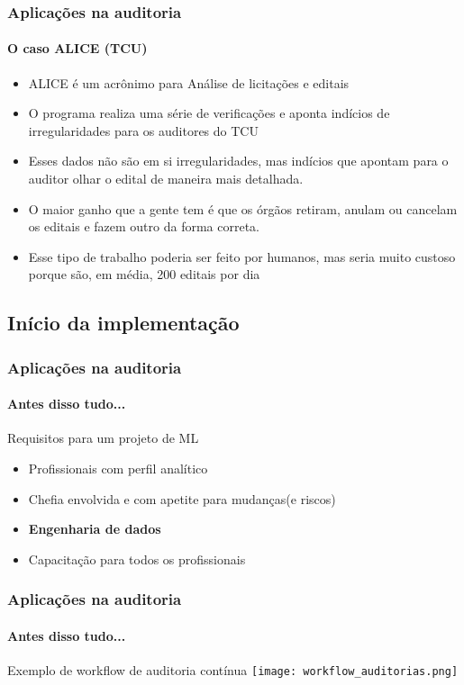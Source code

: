 \documentclass[aspectratio=169]{beamer}
\begin{document}
\begin{frame}
    \frametitle{Aplicações na auditoria}
    \framesubtitle{O caso ALICE (TCU)}
    \begin{itemize}
        \item ALICE é um acrônimo para Análise de licitações e editais
        \item O programa realiza uma série de verificações e aponta indícios de
            irregularidades para os auditores do TCU
        \item Esses dados não são em si irregularidades, mas indícios que 
            apontam para o auditor olhar o edital de maneira mais detalhada.
        \item O maior ganho que a gente tem é que os órgãos retiram, anulam ou 
            cancelam os editais e fazem outro da forma correta.
        \item Esse tipo de trabalho poderia ser feito por humanos, mas seria 
            muito custoso porque são, em média, 200 editais por dia
    \end{itemize}
\end{frame}


\subsection{Início da implementação}
\begin{frame}
    \frametitle{Aplicações na auditoria}
    \framesubtitle{Antes disso tudo...}
    \begin{block}{Requisitos para um projeto de ML}
        \begin{itemize}
            \item Profissionais com perfil analítico
            \item Chefia envolvida e com apetite para mudanças(e riscos)
            \item \alert{\textbf{Engenharia de dados}}
            \item Capacitação para todos os profissionais
        \end{itemize}

    \end{block}
\end{frame}


\begin{frame}
    \frametitle{Aplicações na auditoria}
    \framesubtitle{Antes disso tudo...}
    \begin{block}{Exemplo de workflow de auditoria contínua}
        \centering
        \texttt{[image: workflow\_auditorias.png]}
    \end{block}
\end{frame}
\end{document}
